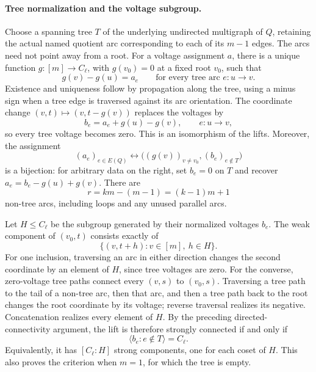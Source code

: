 \documentclass[11pt,letterpaper]{article}
\theoremstyle{remark}\newtheorem{remark}[theorem]{Remark}
\numberwithin{equation}{section}
\begin{document}
\paragraph{Tree normalization and the voltage subgroup.}
Choose a spanning tree $T$ of the underlying undirected multigraph
of $Q$, retaining the actual named quotient arc corresponding to
each of its $m-1$ edges.  The arcs need not point away from a root.
For a voltage assignment $a$, there is a unique function
$g:[m]\to C_\ell$, with $g(v_0)=0$ at a fixed root $v_0$, such that
\[
 g(v)-g(u)=a_e
 \qquad\text{for every tree arc }e:u\to v.
\]
Existence and uniqueness follow by propagation along the tree,
using a minus sign when a tree edge is traversed against its arc
orientation.  The coordinate change $(v,t)\mapsto(v,t-g(v))$
replaces the voltages by
\[
 b_e=a_e+g(u)-g(v),\qquad e:u\to v,
\]
so every tree voltage becomes zero.  This is an isomorphism of the
lifts.  Moreover, the assignment
\[
 (a_e)_{e\in E(Q)}\longleftrightarrow
 \bigl((g(v))_{v\ne v_0},(b_e)_{e\notin T}\bigr)
\]
is a bijection: for arbitrary data on the right, set $b_e=0$ on
$T$ and recover $a_e=b_e-g(u)+g(v)$.  There are
\[
 r=km-(m-1)=(k-1)m+1
\]
non-tree arcs, including loops and any unused parallel arcs.

Let $H\leq C_\ell$ be the subgroup generated by their normalized
voltages $b_e$.  The weak component of $(v_0,t)$ consists exactly of
\[
 \{(v,t+h):v\in[m],\ h\in H\}.
\]
For one inclusion, traversing an arc in either direction changes
the second coordinate by an element of $H$, since tree voltages
are zero.  For the converse, zero-voltage tree paths connect every
$(v,s)$ to $(v_0,s)$.  Traversing a tree path to the tail of a
non-tree arc, then that arc, and then a tree path back to the root
changes the root coordinate by its voltage; reverse traversal
realizes its negative.  Concatenation realizes every element of
$H$.  By the preceding directed-connectivity argument, the lift
is therefore strongly connected if and only if
\[
 \langle b_e:e\notin T\rangle=C_\ell.
\]
Equivalently, it has $[C_\ell:H]$ strong components, one for each
coset of $H$.  This also proves the criterion when $m=1$, for
which the tree is empty.
\end{document}
